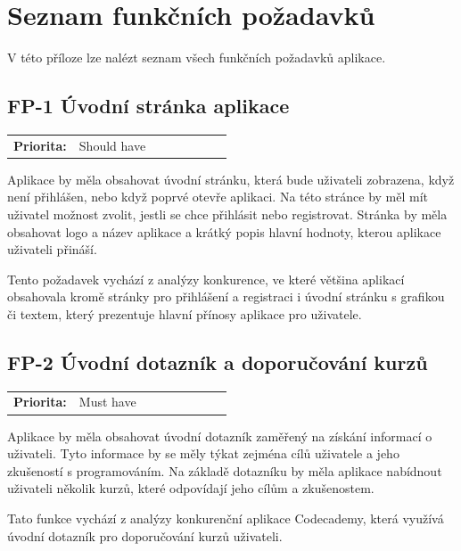 \chapter{Seznam funkčních požadavků}\label{chapter:requirements-list}

V této příloze lze nalézt seznam všech funkčních požadavků aplikace.

\section{FP-1 Úvodní stránka aplikace}\label{sec:fp-welcome-page}

\begin{tabular}{lp{0.7\linewidth}}
    \textbf{Priorita:} & Should have \\
\end{tabular}

Aplikace by měla obsahovat úvodní stránku, která bude uživateli zobrazena, když není přihlášen, nebo když poprvé otevře aplikaci. Na této stránce by měl mít uživatel možnost zvolit, jestli se chce přihlásit nebo registrovat. Stránka by měla obsahovat logo a název aplikace a krátký popis hlavní hodnoty, kterou aplikace uživateli přináší.

Tento požadavek vychází z analýzy konkurence, ve které většina aplikací obsahovala kromě stránky pro přihlášení a registraci i úvodní stránku s grafikou či textem, který prezentuje hlavní přínosy aplikace pro uživatele.

\section{FP-2 Úvodní dotazník a doporučování kurzů}\label{sec:fp-onboarding}

\begin{tabular}{lp{0.7\linewidth}}
    \textbf{Priorita:} & Must have \\
\end{tabular}

Aplikace by měla obsahovat úvodní dotazník zaměřený na získání informací o uživateli. Tyto informace by se měly týkat zejména cílů uživatele a jeho zkušeností s programováním. Na základě dotazníku by měla aplikace nabídnout uživateli několik kurzů, které odpovídají jeho cílům a zkušenostem.

Tato funkce vychází z analýzy konkurenční aplikace Codecademy, která využívá úvodní dotazník pro doporučování kurzů uživateli.

